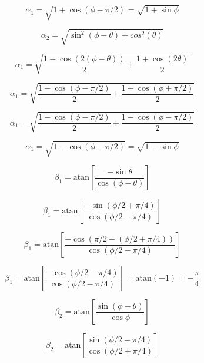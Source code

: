 \documentclass{article}
\begin{document}
\begin{equation}
	\alpha_1 = \sqrt{1+\cos(\phi-\pi/2)} = \sqrt{1+\sin\phi}
\end{equation}

\begin{equation}
	\alpha_2 = \sqrt{\sin^2(\phi-\theta)+cos^2(\theta)}
\end{equation}

\begin{equation}
	\alpha_1 = \sqrt{\frac{1-\cos(2(\phi-\theta))}{2}+\frac{1+\cos(2\theta)}{2}}
\end{equation}

\begin{equation}
	\alpha_1 = \sqrt{\frac{1-\cos(\phi-\pi/2)}{2}+\frac{1+\cos(\phi+\pi/2)}{2}}
\end{equation}

\begin{equation}
	\alpha_1 = \sqrt{\frac{1-\cos(\phi-\pi/2)}{2}+\frac{1-\cos(\phi-\pi/2)}{2}}
\end{equation}

\begin{equation}
	\alpha_1 = \sqrt{1-\cos(\phi-\pi/2)} = \sqrt{1-\sin\phi}
\end{equation}

\begin{equation}
	\beta_1 = \text{atan}\left[\frac{-\sin\theta}{\cos(\phi-\theta)}\right]
\end{equation}

\begin{equation}
	\beta_1 = \text{atan}\left[\frac{-\sin(\phi/2+\pi/4)}{\cos(\phi/2-\pi/4)}\right]
\end{equation}

\begin{equation}
	\beta_1 = \text{atan}\left[\frac{-\cos(\pi/2-(\phi/2+\pi/4))}{\cos(\phi/2-\pi/4)}\right]
\end{equation}

\begin{equation}
	\beta_1 = \text{atan}\left[\frac{-\cos(\phi/2-\pi/4)}{\cos(\phi/2-\pi/4)}\right] = \text{atan}(-1) = -\frac{\pi}{4}
\end{equation}

\begin{equation}
	\beta_2 = \text{atan}\left[\frac{\sin(\phi-\theta)}{\cos\phi}\right]
\end{equation}

\begin{equation}
	\beta_2 = \text{atan}\left[\frac{\sin(\phi/2-\pi/4)}{\cos(\phi/2+\pi/4)}\right]
\end{equation}
\end{document}
